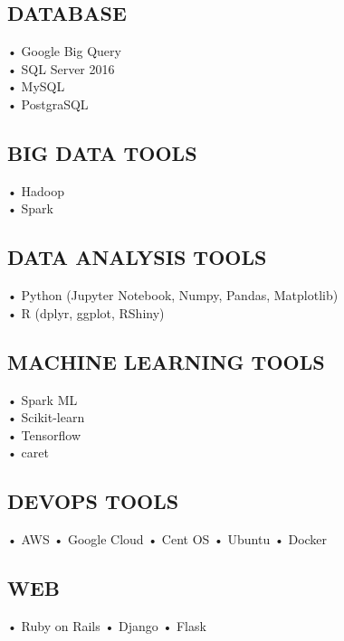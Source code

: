 \documentclass[letterpaper]{deedy-resume} %
\begin{document}
\begin{minipage}[t]{0.33\textwidth}
\subsection{DATABASE}
• Google Big Query \\
• SQL Server 2016 \\
• MySQL \\
• PostgraSQL
\sectionspace %

\subsection{BIG DATA TOOLS}
• Hadoop \\
• Spark \\
\sectionspace %

\subsection{DATA ANALYSIS TOOLS}
• Python (Jupyter Notebook, Numpy, Pandas, Matplotlib) \\
• R (dplyr, ggplot, RShiny)

\sectionspace %

\subsection{MACHINE LEARNING TOOLS}
• Spark ML \\
• Scikit-learn \\
• Tensorflow \\
• caret

\sectionspace %

\subsection{DEVOPS TOOLS}
• AWS • Google Cloud • Cent OS •
Ubuntu • Docker

\sectionspace %

\subsection{WEB}
• Ruby on Rails • Django • Flask

\sectionspace %


\end{minipage} %
\end{document}
